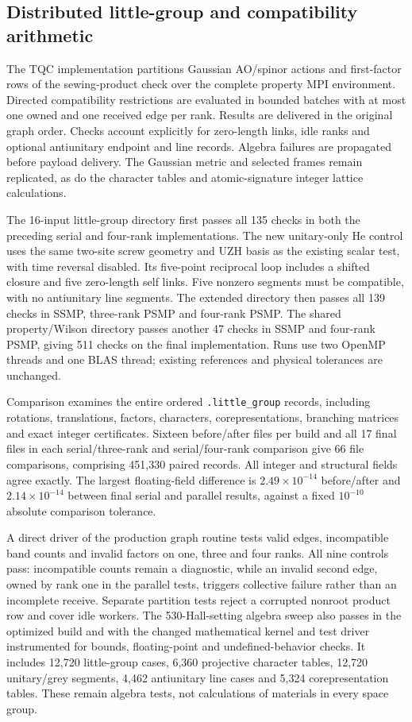 \documentclass[11pt]{article}
\begin{document}
\subsection{Distributed little-group and compatibility arithmetic}
The TQC implementation partitions Gaussian AO/spinor actions and
first-factor rows of the sewing-product check over the complete
property MPI environment. Directed compatibility restrictions are
evaluated in bounded batches with at most one owned and one received
edge per rank. Results are delivered in the original graph order.
Checks account explicitly for zero-length links, idle ranks and
optional antiunitary endpoint and line records. Algebra failures
are propagated before payload delivery. The Gaussian metric and
selected frames remain replicated, as do the character tables and
atomic-signature integer lattice calculations.

The 16-input little-group directory first passes all 135 checks
in both the preceding serial and four-rank implementations.
The new unitary-only He control uses the same two-site screw
geometry and UZH basis as the existing scalar test, with time
reversal disabled. Its five-point reciprocal loop includes a
shifted closure and five zero-length self links. Five nonzero
segments must be compatible, with no antiunitary line segments.
The extended directory then passes all 139 checks in SSMP,
three-rank PSMP and four-rank PSMP. The shared property/Wilson
directory passes another 47 checks in SSMP and four-rank PSMP,
giving 511 checks on the final implementation. Runs use two
OpenMP threads and one BLAS thread; existing references and
physical tolerances are unchanged.

Comparison examines the entire ordered \texttt{.little\_group}
records, including rotations, translations, factors, characters,
corepresentations, branching matrices and exact integer
certificates. Sixteen before/after files per build and all 17
final files in each serial/three-rank and serial/four-rank
comparison give 66 file comparisons, comprising 451,330 paired
records. All integer and structural fields agree exactly.
The largest floating-field difference is
$2.49\times10^{-14}$ before/after and
$2.14\times10^{-14}$ between final serial and parallel results,
against a fixed $10^{-10}$ absolute comparison tolerance.

A direct driver of the production graph routine tests valid
edges, incompatible band counts and invalid factors on one,
three and four ranks. All nine controls pass: incompatible
counts remain a diagnostic, while an invalid second edge,
owned by rank one in the parallel tests, triggers collective
failure rather than an incomplete receive. Separate partition
tests reject a corrupted nonroot product row and cover idle
workers. The 530-Hall-setting algebra sweep also passes in the
optimized build and with the changed mathematical kernel and
test driver instrumented for bounds, floating-point and
undefined-behavior checks. It includes 12,720 little-group
cases, 6,360 projective character tables, 12,720 unitary/grey
segments, 4,462 antiunitary line cases and 5,324
corepresentation tables. These remain algebra tests, not
calculations of materials in every space group.
\end{document}
